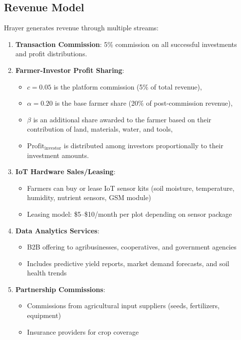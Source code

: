 \documentclass[9pt,twocolumn,twoside]{article}
\begin{document}
\subsection{Revenue Model}

Hrayer generates revenue through multiple streams:

\begin{enumerate}
  \item \textbf{Transaction Commission}: 5\% commission on all successful investments and profit distributions.
  \item \textbf{Farmer-Investor Profit Sharing}:
    \begin{itemize}
        \item $c = 0.05$ is the platform commission (5\% of total revenue),
        \item $\alpha = 0.20$ is the base farmer share (20\% of post-commission revenue),
        \item $\beta$ is an additional share awarded to the farmer based on their contribution of land, materials, water, and tools,
        \item $\text{Profit}_{\text{investor}}$ is distributed among investors proportionally to their investment amounts.
    \end{itemize}
  \item \textbf{IoT Hardware Sales/Leasing}:
    \begin{itemize}
      \item Farmers can buy or lease IoT sensor kits (soil moisture, temperature, humidity, nutrient sensors, GSM module)
      \item Leasing model: \$5–\$10/month per plot depending on sensor package
    \end{itemize}
  \item \textbf{Data Analytics Services}:
    \begin{itemize}
      \item B2B offering to agribusinesses, cooperatives, and government agencies
      \item Includes predictive yield reports, market demand forecasts, and soil health trends
    \end{itemize}
  \item \textbf{Partnership Commissions}:
    \begin{itemize}
      \item Commissions from agricultural input suppliers (seeds, fertilizers, equipment)
      \item Insurance providers for crop coverage
    \end{itemize}
\end{enumerate}
\end{document}
